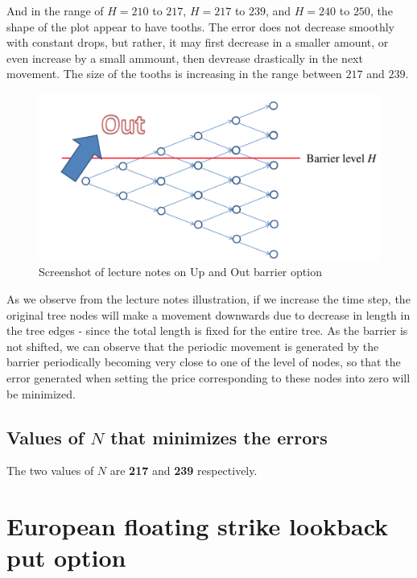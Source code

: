 And in the range of $H = 210$ to $217$, $H = 217$ to $239$, and $H = 240$ to $250$, the shape of the plot appear to have tooths. The error does not decrease smoothly with constant drops, but rather, it may first decrease in a smaller amount, or even increase by a small ammount, then devrease drastically in the next movement. The size of the tooths is increasing in the range between $217$ and $239$.

\begin{figure}[htbp!]
	\centering
	\includegraphics[scale=0.4]{Lattice_lecturenotes.PNG}
	\caption{Screenshot of lecture notes on Up and Out barrier option}
\end{figure}

As we observe from the lecture notes illustration, if we increase the time step, the original tree nodes will make a movement downwards due to decrease in length in the tree edges - since the total length is fixed for the entire tree. As the barrier is not shifted, we can observe that the periodic movement is generated by the barrier periodically becoming very close to one of the level of nodes, so that the error generated when setting the price corresponding to these nodes into zero will be minimized.

\subsection{Values of $N$ that minimizes the errors}
The two values of $N$ are \textbf{217} and \textbf{239} respectively.

\newpage

\section{European floating strike lookback put option}
